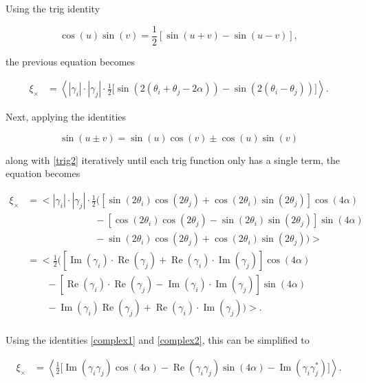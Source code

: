 \documentclass[%
 reprint,
 amsmath,amssymb,
 aps,nofootinbib
]{revtex4-1}
\begin{document}
Using the trig identity

\begin{equation}\label{trig3}
\cos(u)\sin(v)=\frac{1}{2}\left[\sin(u+v)-\sin(u-v)\right],
\end{equation}

the previous equation becomes

\begin{align*}
\xi_\times&=\left<|\gamma_i|\cdot|\gamma_j|\cdot\frac{1}{2}\big[\sin\left(2(\theta_i+\theta_j-2\alpha)\right)-\sin\left(2(\theta_i-\theta_j)\right)\big]\right>.
\end{align*}

Next, applying the identities

\begin{equation}\label{trig4}
\sin(u\pm v)=\sin(u)\cos(v)\pm\cos(u)\sin(v)
\end{equation}

along with \eqref{trig2} iteratively until each trig function only has a single term, the equation becomes

\begin{align*}
\xi_\times&=\Big<|\gamma_i|\cdot|\gamma_j|\cdot\frac{1}{2}\Big(\left[\sin(2\theta_i)\cos(2\theta_j)+\cos(2\theta_i)\sin(2\theta_j)\right]\cos(4\alpha)\\
&\qquad\qquad\qquad\quad-\left[\cos(2\theta_i)\cos(2\theta_j)-\sin(2\theta_i)\sin(2\theta_j)\right]\sin(4\alpha)\\
&\qquad\qquad\qquad\quad-\sin(2\theta_i)\cos(2\theta_j)+\cos(2\theta_i)\sin(2\theta_j)\Big)\Big>\\
&=\Big<\frac{1}{2}\Big(\left[\operatorname{Im}(\gamma_i)\cdot\operatorname{Re}(\gamma_j)+\operatorname{Re}(\gamma_i)\cdot\operatorname{Im}(\gamma_j)\right]\cos(4\alpha)\\
&\qquad-\left[\operatorname{Re}(\gamma_i)\cdot\operatorname{Re}(\gamma_j)-\operatorname{Im}(\gamma_i)\cdot\operatorname{Im}(\gamma_j)\right]\sin(4\alpha)\\
&\qquad-\operatorname{Im}(\gamma_i)\operatorname{Re}(\gamma_j)+\operatorname{Re}(\gamma_i)\cdot\operatorname{Im}(\gamma_j)\Big)\Big>.\\
\end{align*}

Using the identities \eqref{complex1} and \eqref{complex2}, this can be simplified to

\begin{align*}
\xi_\times&=\left<\frac{1}{2}\big[\operatorname{Im}(\gamma_i\gamma_j)\cos(4\alpha)-\operatorname{Re}(\gamma_i\gamma_j)\sin(4\alpha)-\operatorname{Im}(\gamma_i\gamma_j^*)\big]\right>.
\end{align*}
\end{document}
